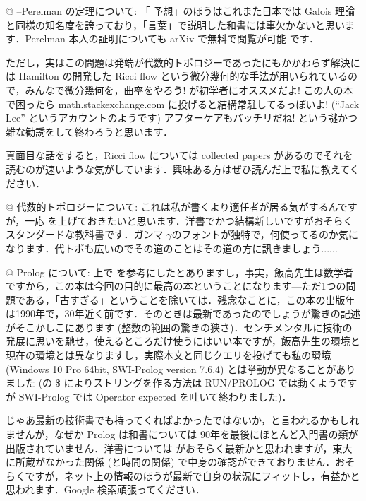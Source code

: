 \documentclass[11pt]{jsarticle}
\begin{document}
\begin{easylist}[itemize]
  @ {\Poincare}--Perelman の定理について: 「{\Poincare} 予想」のほうはこれまた日本では Galois 理論と同様の知名度を誇っており，「言葉」で説明した和書には事欠かないと思います．Perelman 本人の証明についても arXiv で無料で閲覧が可能 \cite{perelman} です．

  ただし，実はこの問題は発端が代数的トポロジーであったにもかかわらず解決には Hamilton の開発した Ricci flow という微分幾何的な手法が用いられているので，みんなで微分幾何を，曲率をやろう! \cite{lee} が初学者にオススメだよ! この人の本で困ったら math.stackexchange.com に投げると結構常駐してるっぽいよ! (``Jack Lee'' というアカウントのようです) アフターケアもバッチリだね! という謎かつ雑な勧誘をして終わろうと思います．

  真面目な話をすると，Ricci flow については collected papers \cite{collected} があるのでそれを読むのが速いような気がしています．興味ある方はぜひ読んだ上で私に教えてください．
  
  @ 代数的トポロジーについて: これは私が書くより適任者が居る気がするんですが，一応 \cite{hatcher} を上げておきたいと思います．洋書でかつ結構新しいですがおそらくスタンダードな教科書です．ガンマ $\gamma$のフォントが独特で，何使ってるのか気になります．代トポも広いのでその道のことはその道の方に訊きましょう......

  @ Prolog について: 上で \cite{iitaka} を参考にしたとありますし，事実，飯高先生は数学者ですから，この本は今回の目的に最高の本ということになります---ただ1つの問題である，「古すぎる」ということを除いては．残念なことに，この本の出版年は1990年で，30年近く前です．そのときは最新であったのでしょうが驚きの記述がそこかしこにあります (整数の範囲の驚きの狭さ)．センチメンタルに技術の発展に思いを馳せ，使えるところだけ使うにはいい本ですが，飯高先生の環境と現在の環境とは異なりますし，実際本文と同じクエリを投げても私の環境 (Windows 10 Pro 64bit, SWI-Prolog version 7.6.4) とは挙動が異なることがありました (\cite[p. 18]{iitaka}の \$ によりストリングを作る方法は RUN/PROLOG では動くようですが SWI-Prolog では Operator expected を吐いて終わりました)．

  じゃあ最新の技術書でも持ってくればよかったではないか，と言われるかもしれませんが，なぜか Prolog は和書については 90年を最後にほとんど入門書の類が出版されていません．洋書については \cite{candm} がおそらく最新かと思われますが，東大に所蔵がなかった関係 (と時間の関係) で中身の確認ができておりません．おそらくですが，ネット上の情報のほうが最新で自身の状況にフィットし，有益かと思われます．Google 検索頑張ってください．
\end{easylist}
\end{document}
